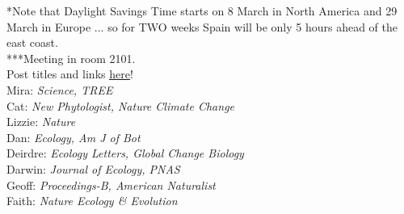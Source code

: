 \documentclass[11pt]{article}
\begin{document}
*Note that Daylight Savings Time starts on 8 March in North America and 29 March in Europe ... so for TWO weeks Spain will be only 5 hours ahead of the east coast.\\
***Meeting in room 2101.
\vspace{7pt}\\
 Post titles and links \href{https://docs.google.com/document/d/1j0WdDbjdp8ERLSO7whvtnP-tOblYMlX33TSCXy_uRKo/edit?usp=sharing}{\underline{here}}!\\
Mira: \emph{Science, TREE} \\
Cat: \emph{New Phytologist, Nature Climate Change}\\
Lizzie: \emph{Nature}\\
Dan: \emph{Ecology, Am J of Bot }\\
Deirdre: \emph{Ecology Letters, Global Change Biology}\\
Darwin: \emph{Journal of Ecology, PNAS}\\
Geoff: \emph{Proceedings-B, American Naturalist} \\
Faith: \emph{Nature Ecology \& Evolution}\\
\end{document}
